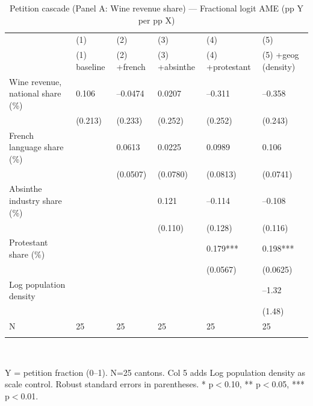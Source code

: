 \begin{table}[tbp] \centering
{}

\caption{Petition cascade (Panel A: Wine revenue share) --- Fractional logit AME (pp Y per pp X)}
\label{tab:T4_X3_FL}
\begin{tabularx}{\linewidth}{@{}lCCCCC@{}}

\toprule
&{(1)}&{(2)}&{(3)}&{(4)}&{(5)} \tabularnewline
 & (1) baseline & (2) +french & (3) +absinthe & (4) +protestant & (5) +geog (density) \tabularnewline 
\midrule \addlinespace[\belowrulesep]
Wine revenue, national share (\%)&0.106&--0.0474&0.0207&--0.311&--0.358 \tabularnewline
&(0.213)&(0.233)&(0.252)&(0.252)&(0.243) \tabularnewline
French language share (\%)&&0.0613&0.0225&0.0989&0.106 \tabularnewline
&&(0.0507)&(0.0780)&(0.0813)&(0.0741) \tabularnewline
Absinthe industry share (\%)&&&0.121&--0.114&--0.108 \tabularnewline
&&&(0.110)&(0.128)&(0.116) \tabularnewline
Protestant share (\%)&&&&0.179***&0.198*** \tabularnewline
&&&&(0.0567)&(0.0625) \tabularnewline
Log population density&&&&&--1.32 \tabularnewline
&&&&&(1.48) \tabularnewline
\midrule N&25&25&25&25&25 \tabularnewline
\bottomrule \addlinespace[\belowrulesep]

\end{tabularx}
\\ \parbox{\linewidth}{\footnotesize Y = petition fraction (0--1). N=25 cantons. Col 5 adds Log population density as scale control. Robust standard errors in parentheses. * p\(<\)0.10, ** p\(<\)0.05, *** p\(<\)0.01.}
\end{table}
